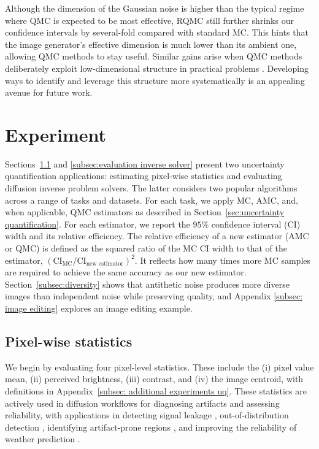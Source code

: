 \documentclass[12pt]{article}
\newcommand{\0}{\mathbf{0}}
\begin{document}
Although the dimension of the Gaussian noise is higher than the typical regime where QMC is expected to be most effective, RQMC still further shrinks our confidence intervals by several-fold compared with standard MC. This hints that the image generator’s effective dimension is much lower than its ambient one, allowing QMC methods to stay useful. Similar gains arise when QMC methods deliberately exploit low-dimensional structure in practical problems \citep{wang2003effective,xiao:wang:2019,liu2023preintegration}. Developing ways to identify and leverage this structure more systematically is an appealing avenue for future work.

\section{Experiment}\label{sec:experiments}

Sections~\ref{subsec:pixel} and \ref{subsec:evaluation inverse solver} present two uncertainty quantification applications: estimating pixel-wise statistics and evaluating diffusion inverse problem solvers. The latter considers two popular algorithms across a range of tasks and datasets. For each task, we apply MC, AMC, and, when applicable, QMC estimators as described in Section~\ref{sec:uncertainty quantification}. 
For each estimator, we report the $95\%$ confidence interval (CI) width and its relative efficiency. 
The relative efficiency of a new estimator (AMC or QMC) is defined as the squared ratio of the MC CI width to that of the estimator,  $\left(\text{CI}_{\text{MC}}/\text{CI}_{\text{new estimator}}\right)^{2}.
$
It reflects how many times more MC samples are required to achieve the same accuracy as our new estimator.
Section~\ref{subsec:diversity} shows that antithetic noise produces more diverse images than independent noise while preserving quality, and Appendix \ref{subsec: image editing} explores an image editing example.



\subsection{Pixel-wise statistics}\label{subsec:pixel}

We begin by evaluating four pixel-level statistics. These include the (i) pixel value mean, (ii) perceived brightness,  (iii) contrast, and (iv) the image centroid, with definitions in Appendix~\ref{subsec: additional experiments uq}. These statistics   
are actively used in diffusion workflows for diagnosing artifacts and assessing reliability, with applications in detecting signal leakage \citep{lin2024common,everaert2024exploiting}, out-of-distribution detection \citep{le2024detecting}, identifying artifact-prone regions \citep{kou2024bayesdiff}, and improving the reliability of weather prediction \citep{li2024generative}.
\end{document}
